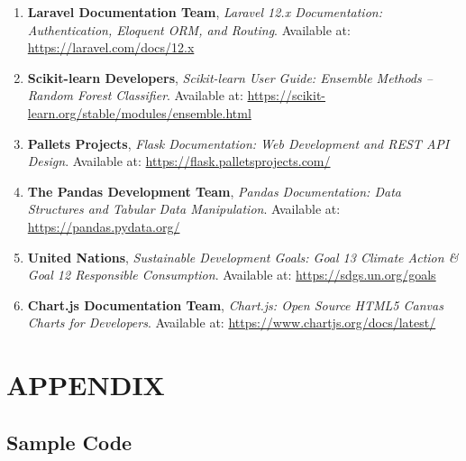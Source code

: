 \documentclass[12pt,a4paper]{report}
\begin{document}
\begin{enumerate}
    \item \textbf{Laravel Documentation Team}, \textit{Laravel 12.x Documentation: Authentication, Eloquent ORM, and Routing}. Available at: \url{https://laravel.com/docs/12.x}
    \item \textbf{Scikit-learn Developers}, \textit{Scikit-learn User Guide: Ensemble Methods -- Random Forest Classifier}. Available at: \url{https://scikit-learn.org/stable/modules/ensemble.html}
    \item \textbf{Pallets Projects}, \textit{Flask Documentation: Web Development and REST API Design}. Available at: \url{https://flask.palletsprojects.com/}
    \item \textbf{The Pandas Development Team}, \textit{Pandas Documentation: Data Structures and Tabular Data Manipulation}. Available at: \url{https://pandas.pydata.org/}
    \item \textbf{United Nations}, \textit{Sustainable Development Goals: Goal 13 Climate Action \& Goal 12 Responsible Consumption}. Available at: \url{https://sdgs.un.org/goals}
    \item \textbf{Chart.js Documentation Team}, \textit{Chart.js: Open Source HTML5 Canvas Charts for Developers}. Available at: \url{https://www.chartjs.org/docs/latest/}
\end{enumerate}

\chapter{APPENDIX}

\section{Sample Code}
\end{document}
